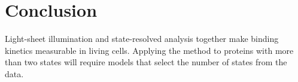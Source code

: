 \chapter{Conclusion}
\label{ch:conclusion}

Light-sheet illumination and state-resolved analysis together make binding kinetics measurable
in living cells. Applying the method to proteins with more than two states will require models
that select the number of states from the data.
